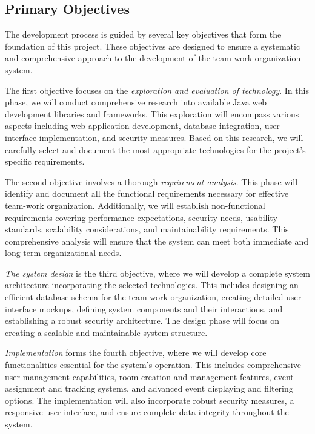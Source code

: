 \subsection{Primary Objectives}\label{subsec:primary-objectives}
The development process is guided by several key objectives that form the foundation of this project.
These objectives are designed to ensure a systematic and comprehensive approach to the development of the team-work organization system.

The first objective focuses on the \textit{exploration and evaluation of technology}.
In this phase, we will conduct comprehensive research into available Java web development libraries and frameworks.
This exploration will encompass various aspects including web application development, database integration, user interface implementation, and security measures.
Based on this research, we will carefully select and document the most appropriate technologies for the project's specific requirements.

The second objective involves a thorough \textit{requirement analysis}.
This phase will identify and document all the functional requirements necessary for effective team-work organization.
Additionally, we will establish non-functional requirements covering performance expectations, security needs, usability standards, scalability considerations, and maintainability requirements.
This comprehensive analysis will ensure that the system can meet both immediate and long-term organizational needs.

\textit{The system design} is the third objective, where we will develop a complete system architecture incorporating the selected technologies.
This includes designing an efficient database schema for the team work organization, creating detailed user interface mockups, defining system components and their interactions, and establishing a robust security architecture.
The design phase will focus on creating a scalable and maintainable system structure.

\textit{Implementation} forms the fourth objective, where we will develop core functionalities essential for the system's operation.
This includes comprehensive user management capabilities, room creation and management features, event assignment and tracking systems, and advanced event displaying and filtering options.
The implementation will also incorporate robust security measures, a responsive user interface, and ensure complete data integrity throughout the system.

